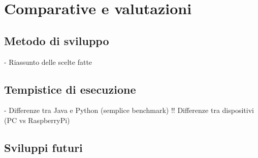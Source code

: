 \chapter{Comparative e valutazioni}

\section{Metodo di sviluppo}
- Riassunto delle scelte fatte

\section{Tempistice di esecuzione}
- Differenze tra Java e Python (semplice benchmark)
!! Differenze tra dispositivi (PC vs RaspberryPi)

\section{Sviluppi futuri}
